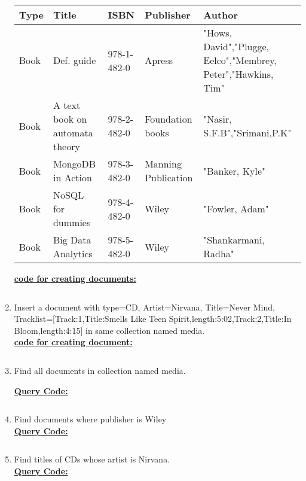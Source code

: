\documentclass[11pt,article]{memoir}
\begin{document}
\begin{flushleft}
\begin{enumerate}
\begin{table}[h]
\begin{tabular}{|p{1.5cm}|p{2cm}|p{2.0cm}|p{1.5cm}|p{6.5cm}|}
\hline \textbf{Type} & \textbf{Title} & \textbf{ISBN} & \textbf{Publisher} & \textbf{Author} \\ 
\hline Book & Def. guide & 978-1-482-0 & Apress & "Hows, David","Plugge,
Eelco","Membrey, Peter","Hawkins, Tim" \\ 
\hline Book & A text book on automata theory & 978-2-482-0 & Foundation books & "Nasir, S.F.B","Srimani,P.K" \\
\hline Book & MongoDB in Action & 978-3-482-0 & Manning Publication & "Banker, Kyle"\\
\hline Book & NoSQL for dummies & 978-4-482-0 & Wiley & "Fowler, Adam"\\
\hline Book & Big Data Analytics & 978-5-482-0 & Wiley & "Shankarmani, Radha"\\
\hline 
\end{tabular} 
\end{table}
\textbf{\underline{code for creating documents:}}
\begin{lstlisting}

\end{lstlisting}
\item Insert a document with type=CD, Artist=Nirvana, Title=Never Mind, Tracklist=[{Track:1,Title:Smells Like Teen Spirit,length:5:02},{Track:2,Title:In Bloom,length:4:15}] in same collection named media.\\
\textbf{\underline{code for creating document:}}
\begin{lstlisting}

\end{lstlisting}
\item Find all documents in collection named media.

\textbf{\underline{Query Code:}}
\begin{lstlisting}

\end{lstlisting}
\item Find documents where publisher is Wiley
\\
\textbf{\underline{Query Code:}}
\begin{lstlisting}

\end{lstlisting}
\item Find titles of CDs whose artist is Nirvana.
\\
\textbf{\underline{Query Code:}}
\begin{lstlisting}


\end{lstlisting}
\end{enumerate}
\end{flushleft}
\end{document}
